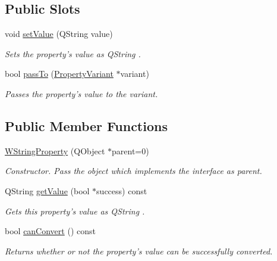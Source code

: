 \subsection*{Public Slots}
\begin{DoxyCompactItemize}
\item 
void \hyperlink{class_w_string_property_a009c775b69f7365fac0e301ce7d88d2b}{set\-Value} (Q\-String value)
\begin{DoxyCompactList}\small\item\em Sets the property's value as Q\-String . \end{DoxyCompactList}\item 
bool \hyperlink{class_w_string_property_abb5585ce99204a46fb14a5b8cd41ef42}{pass\-To} (\hyperlink{class_property_variant}{Property\-Variant} $\ast$variant)
\begin{DoxyCompactList}\small\item\em Passes the property's value to the variant. \end{DoxyCompactList}\end{DoxyCompactItemize}
\subsection*{Public Member Functions}
\begin{DoxyCompactItemize}
\item 
\hyperlink{class_w_string_property_a228ffc3c7c49e3964e0ed7d59d4e30dd}{W\-String\-Property} (Q\-Object $\ast$parent=0)
\begin{DoxyCompactList}\small\item\em Constructor. Pass the object which implements the interface as parent. \end{DoxyCompactList}\item 
Q\-String \hyperlink{class_w_string_property_a4f31475a4b8cd8f7958bbfdaba6cca42}{get\-Value} (bool $\ast$success) const 
\begin{DoxyCompactList}\small\item\em Gets this property's value as Q\-String . \end{DoxyCompactList}\item 
bool \hyperlink{class_w_string_property_a6b52241cfefcea196a347bc90f57dc25}{can\-Convert} () const 
\begin{DoxyCompactList}\small\item\em Returns whether or not the property's value can be successfully converted. \end{DoxyCompactList}\end{DoxyCompactItemize}
